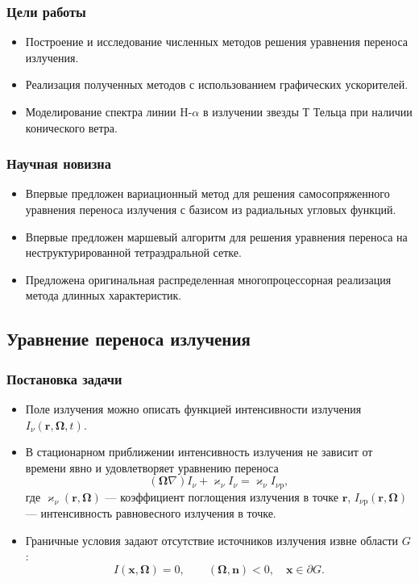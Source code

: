 \documentclass[unicode,aspectratio=43]{beamer}
\newcommand{\I}{\mathrm{\mathit{I}}}
\renewcommand{\vec}[1]{\boldsymbol{\mathbf{#1}}}
\begin{document}
\begin{frame}\frametitle{Цели работы}
	\begin{itemize}
	\item Построение и исследование численных методов решения уравнения переноса излучения.
	\item Реализация полученных методов с использованием графических ускорителей.
	\item Моделирование спектра линии H-$\alpha$ в излучении звезды Т Тельца при наличии конического ветра.
	\end{itemize}
\end{frame}

\begin{frame}\frametitle{Научная новизна}
	\begin{itemize}
	\item Впервые предложен вариационный метод для решения самосопряженного уравнения переноса излучения с базисом из радиальных угловых функций.
	\item Впервые предложен маршевый алгоритм для решения уравнения переноса на неструктурированной тетраэдральной сетке.
	\item Предложена оригинальная распределенная многопроцессорная реализация метода длинных характеристик.
	\end{itemize}
\end{frame}

\subsection{Уравнение переноса излучения}

\begin{frame}\frametitle{Постановка задачи}
	\begin{itemize}
	\item Поле излучения можно описать функцией интенсивности излучения $\I_\nu(\vec r,
\vec \Omega, t)$.
	\item В стационарном приближении интенсивность излучения не зависит от времени явно и
удовлетворяет уравнению переноса
	\[
		(\vec \Omega \nabla) \I_\nu + \varkappa_\nu \I_\nu = \varkappa_\nu \I_{\nu\text{p}},
	\]
	где $\varkappa_\nu(\vec r, \vec \Omega)$ --- коэффициент поглощения излучения в точке $\vec
r$, $\I_{\nu\text{p}}(\vec r, \vec \Omega)$ --- интенсивность равновесного излучения в точке.
	\item Граничные условия задают отсутствие источников излучения извне
области $G$:
	\[
		\I(\vec x, \vec \Omega) = 0, \qquad (\vec \Omega, \vec n) < 0, \quad
\vec x \in \partial G.
	\]
	\end{itemize}
\end{frame}
\end{document}
